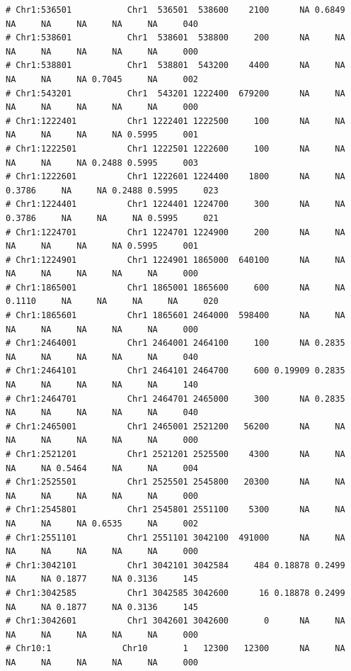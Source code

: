 \documentclass{article}\usepackage[]{graphicx}\usepackage[]{color}
\makeatletter
\newenvironment{kframe}{%
 \def\at@end@of@kframe{}%
 \ifinner\ifhmode%
  \def\at@end@of@kframe{\end{minipage}}%
  \begin{minipage}{\columnwidth}%
 \fi\fi%
 \def\FrameCommand##1{\hskip\@totalleftmargin \hskip-\fboxsep
 \colorbox{shadecolor}{##1}\hskip-\fboxsep
     \hskip-\linewidth \hskip-\@totalleftmargin \hskip\columnwidth}%
 \MakeFramed {\advance\hsize-\width
   \@totalleftmargin\z@ \linewidth\hsize
   \@setminipage}}%
 {\par\unskip\endMakeFramed%
 \at@end@of@kframe}
\newenvironment{knitrout}{}{} %
\makeatother
\begin{document}
\begin{knitrout}
\begin{kframe}
\begin{verbatim}
# Chr1:536501           Chr1  536501  538600    2100      NA 0.6849     NA     NA     NA     NA     NA     040
# Chr1:538601           Chr1  538601  538800     200      NA     NA     NA     NA     NA     NA     NA     000
# Chr1:538801           Chr1  538801  543200    4400      NA     NA     NA     NA     NA 0.7045     NA     002
# Chr1:543201           Chr1  543201 1222400  679200      NA     NA     NA     NA     NA     NA     NA     000
# Chr1:1222401          Chr1 1222401 1222500     100      NA     NA     NA     NA     NA     NA 0.5995     001
# Chr1:1222501          Chr1 1222501 1222600     100      NA     NA     NA     NA     NA 0.2488 0.5995     003
# Chr1:1222601          Chr1 1222601 1224400    1800      NA     NA 0.3786     NA     NA 0.2488 0.5995     023
# Chr1:1224401          Chr1 1224401 1224700     300      NA     NA 0.3786     NA     NA     NA 0.5995     021
# Chr1:1224701          Chr1 1224701 1224900     200      NA     NA     NA     NA     NA     NA 0.5995     001
# Chr1:1224901          Chr1 1224901 1865000  640100      NA     NA     NA     NA     NA     NA     NA     000
# Chr1:1865001          Chr1 1865001 1865600     600      NA     NA 0.1110     NA     NA     NA     NA     020
# Chr1:1865601          Chr1 1865601 2464000  598400      NA     NA     NA     NA     NA     NA     NA     000
# Chr1:2464001          Chr1 2464001 2464100     100      NA 0.2835     NA     NA     NA     NA     NA     040
# Chr1:2464101          Chr1 2464101 2464700     600 0.19909 0.2835     NA     NA     NA     NA     NA     140
# Chr1:2464701          Chr1 2464701 2465000     300      NA 0.2835     NA     NA     NA     NA     NA     040
# Chr1:2465001          Chr1 2465001 2521200   56200      NA     NA     NA     NA     NA     NA     NA     000
# Chr1:2521201          Chr1 2521201 2525500    4300      NA     NA     NA     NA 0.5464     NA     NA     004
# Chr1:2525501          Chr1 2525501 2545800   20300      NA     NA     NA     NA     NA     NA     NA     000
# Chr1:2545801          Chr1 2545801 2551100    5300      NA     NA     NA     NA     NA 0.6535     NA     002
# Chr1:2551101          Chr1 2551101 3042100  491000      NA     NA     NA     NA     NA     NA     NA     000
# Chr1:3042101          Chr1 3042101 3042584     484 0.18878 0.2499     NA     NA 0.1877     NA 0.3136     145
# Chr1:3042585          Chr1 3042585 3042600      16 0.18878 0.2499     NA     NA 0.1877     NA 0.3136     145
# Chr1:3042601          Chr1 3042601 3042600       0      NA     NA     NA     NA     NA     NA     NA     000
# Chr10:1              Chr10       1   12300   12300      NA     NA     NA     NA     NA     NA     NA     000

\end{verbatim}
\end{kframe}
\end{knitrout}
\end{document}
